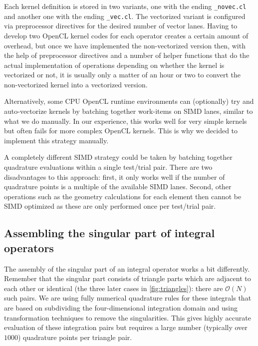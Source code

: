 Each kernel definition is stored in two variants, one with the ending \texttt{\_novec.cl} and another one with the ending \texttt{\_vec.cl}. The vectorized variant is configured via preprocessor directives for the desired number of vector lanes. Having to develop two OpenCL kernel codes for each operator creates a certain amount of overhead, but once we have implemented the non-vectorized version then, with the help of preprocessor directives and a number of helper functions that do the actual implementation of operations depending on whether the kernel is vectorized or not, it is usually only a matter of an hour or two to convert the non-vectorized kernel into a vectorized version.

Alternatively, some CPU OpenCL runtime environments can (optionally) try and auto-vectorize kernels by batching together work-items on SIMD lanes, similar to what we do manually. In our experience, this works well for very simple kernels but often fails for more complex OpenCL kernels. This is why we decided to implement this strategy manually.

A completely different SIMD strategy could be taken by batching together quadrature evaluations within a single test/trial pair. There are two disadvantages to this approach: first, it only works well if the number of quadrature points is a multiple of the available SIMD lanes. Second, other operations such as the geometry calculations for each element then cannot be SIMD optimized as these are only performed once per test/trial pair.

\subsection{Assembling the singular part of integral operators}
The assembly of the singular part of an integral operator works a bit differently. Remember that the singular part consists of triangle parts which are adjacent to each other or identical (the three later cases in \cref{fig:triangles}): there are $\mathcal{O}(N)$ such pairs. We are using fully numerical quadrature rules for these integrals that are based on subdividing the four-dimensional integration domain and using transformation techniques to remove the singularities. This gives highly accurate evaluation of these integration pairs but requires a large number (typically over $1000$) quadrature points per triangle pair.

